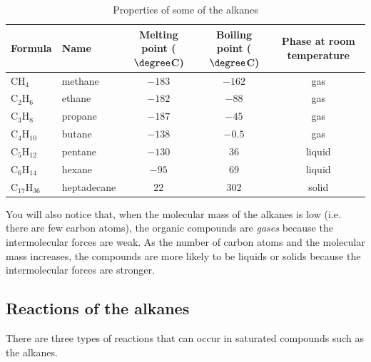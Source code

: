 \begin{table}[h]
\begin{center}
\begin{tabular}{|l|l|c|c|c|}\hline
\textbf{Formula} & \textbf{Name} & \textbf{Melting point ($\degree$C)} & \textbf{Boiling point ($\degree$C)} & \textbf{Phase at room temperature}\\\hline
CH$_{4}$ & methane & $-183$ & $-162$ & gas\\\hline
C$_{2}$H$_{6}$ & ethane & $-182$ & $-88$  & gas\\\hline
C$_{3}$H$_{8}$ & propane & $-187$ & $-45$ & gas \\\hline
C$_{4}$H$_{10}$ & butane & $-138$ & $-0.5$ & gas \\\hline
C$_{5}$H$_{12}$ & pentane & $-130$ & $36$ & liquid \\\hline
C$_{6}$H$_{14}$ & hexane & $-95$ & $69$ & liquid \\\hline
C$_{17}$H$_{36}$ & heptadecane & $22$ & $302$ & solid \\\hline
\end{tabular}
\caption{Properties of some of the alkanes}
\label{fig:alkane properties}
\end{center}
\end{table}

You will also notice that, when the molecular mass of the alkanes is low (i.e. there are few carbon atoms), the organic compounds are \textit{gases} because the intermolecular forces are weak. As the number of carbon atoms and the molecular mass increases, the compounds are more likely to be liquids or solids because the intermolecular forces are stronger.

\subsection{Reactions of the alkanes}

There are three types of reactions that can occur in saturated compounds such as the alkanes.

